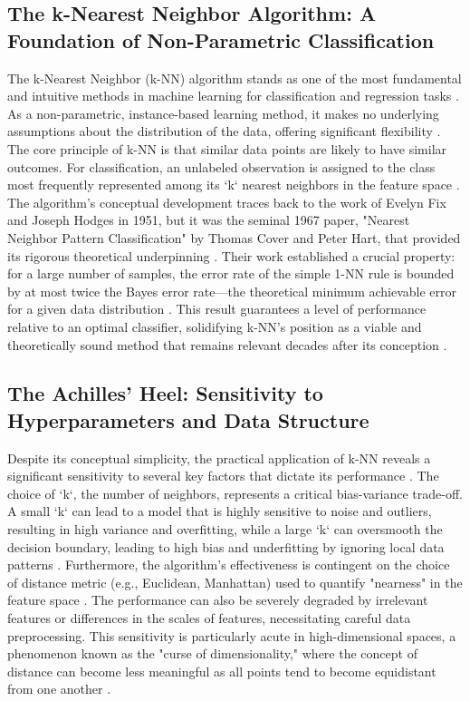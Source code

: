 \documentclass[conference]{IEEEtran}
\begin{document}
\subsection{The k-Nearest Neighbor Algorithm: A Foundation of Non-Parametric Classification}
The k-Nearest Neighbor (k-NN) algorithm stands as one of the most fundamental and intuitive methods in machine learning for classification and regression tasks \cite{b1, b2}. As a non-parametric, instance-based learning method, it makes no underlying assumptions about the distribution of the data, offering significant flexibility \cite{b1, b2}. The core principle of k-NN is that similar data points are likely to have similar outcomes. For classification, an unlabeled observation is assigned to the class most frequently represented among its `k` nearest neighbors in the feature space \cite{b3, b4}. The algorithm's conceptual development traces back to the work of Evelyn Fix and Joseph Hodges in 1951, but it was the seminal 1967 paper, "Nearest Neighbor Pattern Classification" by Thomas Cover and Peter Hart, that provided its rigorous theoretical underpinning \cite{b5, b6}. Their work established a crucial property: for a large number of samples, the error rate of the simple 1-NN rule is bounded by at most twice the Bayes error rate—the theoretical minimum achievable error for a given data distribution \cite{b5, b7}. This result guarantees a level of performance relative to an optimal classifier, solidifying k-NN's position as a viable and theoretically sound method that remains relevant decades after its conception \cite{b8, b9, b10}.

\subsection{The Achilles' Heel: Sensitivity to Hyperparameters and Data Structure}
Despite its conceptual simplicity, the practical application of k-NN reveals a significant sensitivity to several key factors that dictate its performance \cite{b3, b11}. The choice of `k`, the number of neighbors, represents a critical bias-variance trade-off. A small `k` can lead to a model that is highly sensitive to noise and outliers, resulting in high variance and overfitting, while a large `k` can oversmooth the decision boundary, leading to high bias and underfitting by ignoring local data patterns \cite{b3, b12}. Furthermore, the algorithm's effectiveness is contingent on the choice of distance metric (e.g., Euclidean, Manhattan) used to quantify "nearness" in the feature space \cite{b1, b4}. The performance can also be severely degraded by irrelevant features or differences in the scales of features, necessitating careful data preprocessing. This sensitivity is particularly acute in high-dimensional spaces, a phenomenon known as the "curse of dimensionality," where the concept of distance can become less meaningful as all points tend to become equidistant from one another \cite{b4, b11}.
\end{document}
